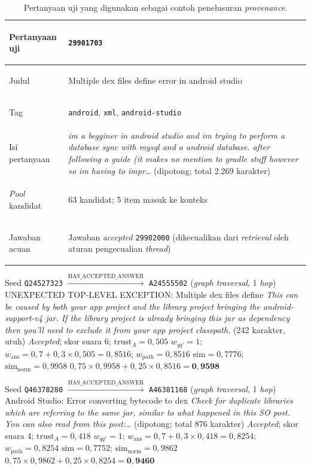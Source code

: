 \begin{table}[!htbp]
\centering
\small
\caption{Pertanyaan uji yang digunakan sebagai contoh penelusuran \emph{provenance}.}
\label{tab:contoh-provenance-pertanyaan}
\renewcommand{\arraystretch}{1.3}
\begin{tabularx}{\textwidth}{|>{\bfseries\raggedright\arraybackslash}p{3.2cm}|X|}
\hline
Pertanyaan uji & \texttt{29901703} \\
\hline
Judul & Multiple dex files define error in android studio \\
\hline
Tag & \texttt{android}, \texttt{xml}, \texttt{android-studio} \\
\hline
Isi pertanyaan & \emph{im a begginer in android studio and im trying to perform a database sync with mysql and a android database. after following a guide (it makes no mention to gradle stuff however so im having to impr\ldots} (dipotong; total 2.269 karakter) \\
\hline
\emph{Pool} kandidat & 63 kandidat; 5 item masuk ke konteks \\
\hline
Jawaban acuan & Jawaban \emph{accepted} \texttt{29902000} (dikecualikan dari \emph{retrieval} oleh aturan pengecualian \emph{thread}) \\
\hline
\end{tabularx}
\end{table}

{Seed \texttt{Q24527323} $\xrightarrow{\text{HAS\_ACCEPTED\_ANSWER}}$ \texttt{A24555502} (\emph{graph traversal}, 1 \emph{hop})}
{UNEXPECTED TOP-LEVEL EXCEPTION: Multiple dex files define}
{\emph{This can be caused by both your app project and the library project bringing the android-support-v4 jar. If the library project is already bringing this jar as dependency then you'll need to exclude it from your app project classpath.} (242 karakter, utuh)}
{\emph{Accepted}; skor suara 6; $\mathrm{trust}_A=0{,}505$}
{$w_{qq'}=1$; $w_{\mathrm{ans}}=0{,}7+0{,}3\times 0{,}505=0{,}8516$; $w_{\mathrm{path}}=0{,}8516$}
{$\mathrm{sim}=0{,}7776$; $\mathrm{sim}_{\mathrm{norm}}=0{,}9958$}
{$0{,}75\times 0{,}9958+0{,}25\times 0{,}8516=\mathbf{0{,}9598}$}

{Seed \texttt{Q46378280} $\xrightarrow{\text{HAS\_ACCEPTED\_ANSWER}}$ \texttt{A46381168} (\emph{graph traversal}, 1 \emph{hop})}
{Android Studio: Error converting bytecode to dex}
{\emph{Check for duplicate libraries which are referring to the same jar, similar to what happened in this SO post. You can also read from this post:\ldots} (dipotong; total 876 karakter)}
{\emph{Accepted}; skor suara 4; $\mathrm{trust}_A=0{,}418$}
{$w_{qq'}=1$; $w_{\mathrm{ans}}=0{,}7+0{,}3\times 0{,}418=0{,}8254$; $w_{\mathrm{path}}=0{,}8254$}
{$\mathrm{sim}=0{,}7752$; $\mathrm{sim}_{\mathrm{norm}}=0{,}9862$}
{$0{,}75\times 0{,}9862+0{,}25\times 0{,}8254=\mathbf{0{,}9460}$}

